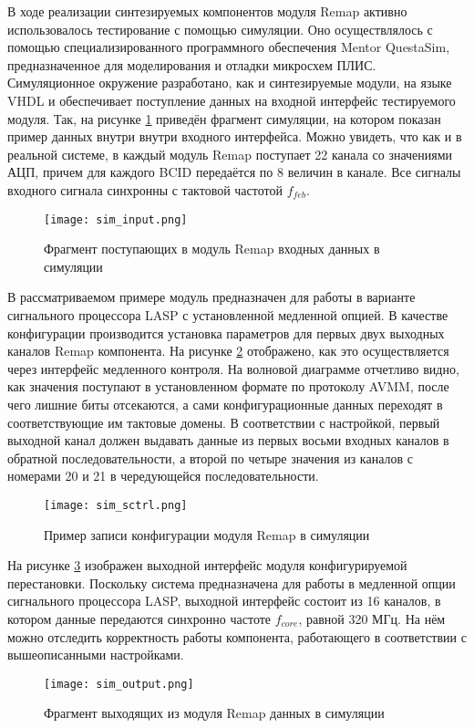 В ходе реализации синтезируемых компонентов модуля Remap активно использовалось тестирование с помощью симуляции. Оно осуществлялось с помощью специализированного программного обеспечения Mentor QuestaSim, предназначенное для моделирования и отладки микросхем ПЛИС. Симуляционное окружение разработано, как и синтезируемые модули, на языке VHDL и обеспечивает поступление данных на входной интерфейс тестируемого модуля. Так, на рисунке \ref{fig:sim_input} приведён фрагмент симуляции, на котором показан пример данных внутри внутри  входного интерфейса. Можно увидеть, что как и в реальной системе, в каждый модуль Remap поступает 22 канала со значениями АЦП, причем для каждого BCID передаётся по 8 величин в канале. Все сигналы входного сигнала синхронны с тактовой частотой $f_{feb}$.\par
\begin{figure}[ht]
    \centering
    \texttt{[image: sim\_input.png]}
    \caption{Фрагмент поступающих в модуль Remap входных данных в симуляции}
    \label{fig:sim_input}
\end{figure}\par
В рассматриваемом примере модуль предназначен для работы в варианте сигнального процессора LASP с установленной медленной опцией. В качестве конфигурации производится установка параметров для первых двух выходных каналов Remap компонента. На рисунке \ref{fig:sim_sctrl} отображено, как это осуществляется через интерфейс медленного контроля. На волновой диаграмме отчетливо видно, как значения поступают в установленном формате по протоколу AVMM, после чего лишние биты отсекаются, а сами конфигурационные данных переходят в соответствующие им тактовые домены. В соответствии с настройкой, первый выходной канал должен выдавать данные из первых восьми входных каналов в обратной последовательности, а второй по четыре значения из каналов с номерами 20 и 21 в чередующейся последовательности.\par
\begin{figure}[ht]
    \centering
    \texttt{[image: sim\_sctrl.png]}
    \caption{Пример записи конфигурации модуля Remap в симуляции}
    \label{fig:sim_sctrl}
\end{figure}\par
На рисунке \ref{fig:sim_output} изображен выходной интерфейс модуля конфигурируемой перестановки. Поскольку система предназначена для работы в медленной опции сигнального процессора LASP, выходной интерфейс состоит из 16 каналов, в котором данные передаются синхронно частоте $f_{core}$, равной 320 МГц. На нём можно отследить корректность работы компонента, работающего в соответствии с вышеописанными настройками. \par
\begin{figure}[ht]
    \centering
    \texttt{[image: sim\_output.png]}
    \caption{Фрагмент выходящих из модуля Remap данных в симуляции}
    \label{fig:sim_output}
\end{figure}\par
